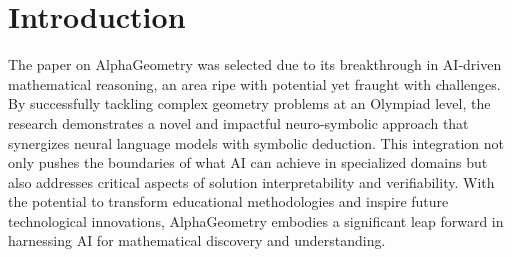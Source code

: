\documentclass[12pt]{article}
\begin{document}
\section{Introduction}
The paper on AlphaGeometry was selected due to its breakthrough in AI-driven mathematical reasoning, an area ripe with potential yet fraught with challenges. By successfully tackling complex geometry problems at an Olympiad level, the research demonstrates a novel and impactful neuro-symbolic approach that synergizes neural language models with symbolic deduction. This integration not only pushes the boundaries of what AI can achieve in specialized domains but also addresses critical aspects of solution interpretability and verifiability. With the potential to transform educational methodologies and inspire future technological innovations, AlphaGeometry embodies a significant leap forward in harnessing AI for mathematical discovery and understanding.



\end{document}

